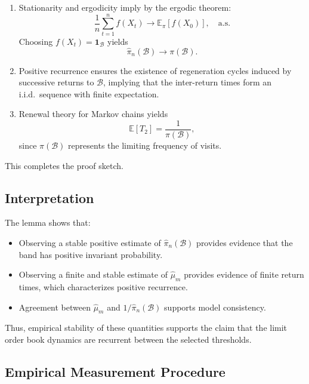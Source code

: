 \documentclass[11pt]{article}
\begin{document}
\begin{enumerate}
    \item Stationarity and ergodicity imply by the ergodic theorem:
    \[
    \frac{1}{n}\sum_{t=1}^{n}f(X_t)\to \mathbb{E}_{\pi}[f(X_0)], \quad\text{a.s.}
    \]
    Choosing $f(X_t)=\mathbf{1}_{\mathcal{B}}$ yields
    \[
    \widehat{\pi}_n(\mathcal{B}) \to \pi(\mathcal{B}).
    \]

    \item Positive recurrence ensures the existence of regeneration cycles induced by successive returns to $\mathcal{B}$, implying that the inter-return times form an i.i.d.\ sequence with finite expectation.

    \item Renewal theory for Markov chains yields
    \[
    \mathbb{E}[T_2]= \frac{1}{\pi(\mathcal{B})},
    \]
    since $\pi(\mathcal{B})$ represents the limiting frequency of visits.
\end{enumerate}

This completes the proof sketch.

\subsection{Interpretation}

The lemma shows that:

\begin{itemize}
    \item Observing a stable positive estimate of $\widehat{\pi}_n(\mathcal{B})$ provides evidence that the band has positive invariant probability.

    \item Observing a finite and stable estimate of $\widehat{\mu}_m$ provides evidence of finite return times, which characterizes positive recurrence.

    \item Agreement between $\widehat{\mu}_m$ and $1/\widehat{\pi}_n(\mathcal{B})$ supports model consistency.
\end{itemize}

Thus, empirical stability of these quantities supports the claim that the limit order book dynamics are recurrent between the selected thresholds.

\subsection{Empirical Measurement Procedure}
\end{document}
